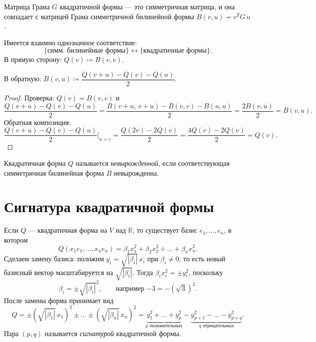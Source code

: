 \begin{stmt}
    Матрица Грама $G$ квадратичной формы --- это симметричная матрица,
    и она совпадает с матрицей Грама симметричной билинейной формы $B(v, u) = v^T G\, u$.

    Имеется взаимно однозначное соответствие:
    \[
        \{\text{симм. билинейные формы}\} \longleftrightarrow \{\text{квадратичные формы}\}.
    \]
    В прямую сторону: $Q(v) \coloneqq B(v, v)$.

    В обратную: $B(v, u) \coloneqq \dfrac{Q(v + u) - Q(v) - Q(u)}{2}$.

    \begin{proof}
        Проверка: $Q(v) = B(v, v)$ и
        \[
            \frac{Q(v+u) - Q(v) - Q(u)}{2} = \frac{B(v+u,\, v+u) - B(v,v) - B(u,u)}{2} = \frac{2B(v,u)
            }{2} = B(v,u).
        \]
        Обратная композиция:
        \[
            \frac{Q(v + u) - Q(v) - Q(u)}{2}\bigg|_{u = v} = \frac{Q(2v) - 2Q(v)}{2} = \frac{4Q(v) - 2Q(v)
            }{2} = Q(v).
        \]
    \end{proof}
\end{stmt}


\begin{definition}
    Квадратичная форма $Q$ называется \emph{невырожденной}, если соответствующая симметричная билинейная форма
    $B$ невырожденна.
\end{definition}


\section{Сигнатура квадратичной формы}

\begin{theorem}[Лагранжа]
    Если $Q$ --- квадратичная форма на $V$ над $\mathbb{R}$, то существует базис $e_1, \dots, e_n$, в котором
    \[
        Q(x_1 e_1, \dots, x_n e_n) = \beta_1 x_1^2 + \beta_2 x_2^2 + \dots + \beta_n x_n^2.
    \]
    Сделаем замену базиса: положим $y_i = \sqrt{|\beta_i|}\, x_i$ при $\beta_i \neq 0$,
    то есть новый базисный вектор масштабируется на $\sqrt{|\beta_i|}$.
    Тогда $\beta_i x_i^2 = \pm y_i^2$, поскольку
    \[
        \beta_i = \pm\sqrt{|\beta_i|}^2, \qquad \text{например } {-3} = -(\sqrt{3})^2.
    \]
    После замены форма принимает вид
    \[
        Q = \pm\!\left(\sqrt{|\beta_1|}\, x_1\right)^2 \pm \dots \pm \left(\sqrt{|\beta_n|}\, x_n\right)^2
          = \underbrace{y_1^2 + \dots + y_p^2}_{p \text{ положительных}}
            - \underbrace{y_{p+1}^2 - \dots - y_{p+q}^2}_{q \text{ отрицательных}}.
    \]
    Пара $(p, q)$ называется \emph{сигнатурой} квадратичной формы.
\end{theorem}


